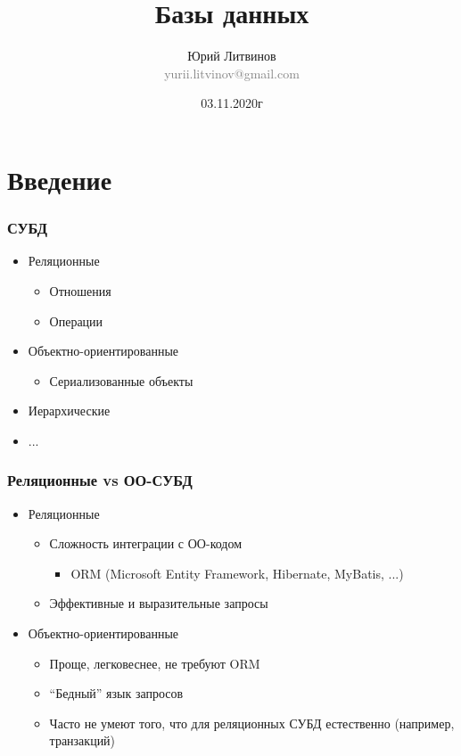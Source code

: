 \documentclass[xetex,mathserif,serif]{beamer}
\title{Базы данных}
\author[Юрий Литвинов]{Юрий Литвинов\\\small{\textcolor{gray}{yurii.litvinov@gmail.com}}}
\date{03.11.2020г}
\begin{document}
    \frame{\titlepage}

    \section{Введение}

    \begin{frame}
        \frametitle{СУБД}
        \begin{itemize}
            \item Реляционные
            \begin{itemize}
                \item Отношения
                \item Операции
            \end{itemize}
            \item Объектно-ориентированные
            \begin{itemize}
                \item Сериализованные объекты
            \end{itemize}
            \item Иерархические
            \item ...
        \end{itemize}
    \end{frame}

    \begin{frame}
        \frametitle{Реляционные vs ОО-СУБД}
        \begin{itemize}
            \item Реляционные
            \begin{itemize}
                \item Сложность интеграции с ОО-кодом
                \begin{itemize}
                    \item ORM (Microsoft Entity Framework, Hibernate, MyBatis, ...)
                \end{itemize}
                \item Эффективные и выразительные запросы
            \end{itemize}
            \item Объектно-ориентированные
            \begin{itemize}
                \item Проще, легковеснее, не требуют ORM
                \item ``Бедный'' язык запросов
                \item Часто не умеют того, что для реляционных СУБД естественно (например, транзакций)
            \end{itemize}
        \end{itemize}
    \end{frame}
\end{document}
